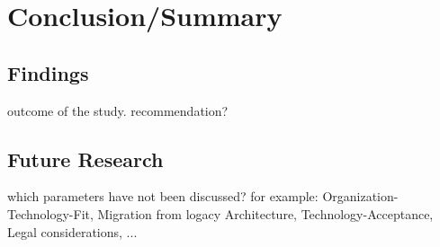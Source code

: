 \chapter{Conclusion/Summary}


\section{Findings}

outcome of the study. recommendation?


\section{Future Research}

which parameters have not been discussed? for example: Organization-Technology-Fit, Migration from logacy Architecture, Technology-Acceptance, Legal considerations, ...
